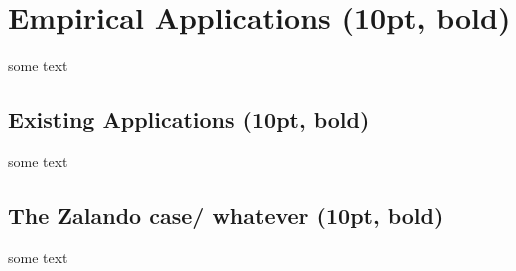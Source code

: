 \section{Empirical Applications (10pt, bold)}
some text

\subsection{Existing Applications (10pt, bold)}
some text

\subsection{The Zalando case/ whatever (10pt, bold)}
some text
